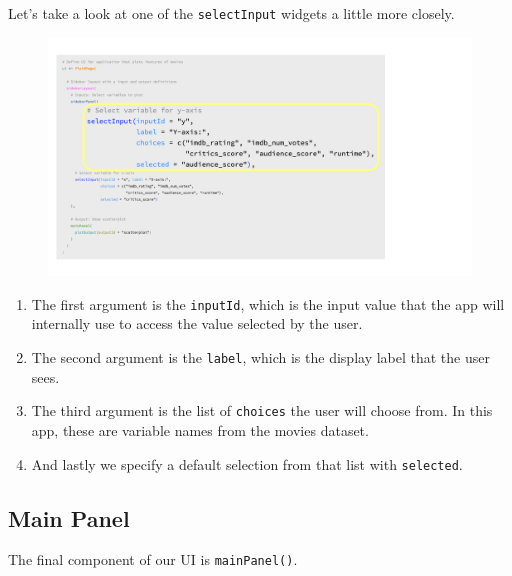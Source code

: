 \documentclass[
  letterpaper,
  DIV=11,
  numbers=noendperiod]{scrreprt}
\begin{document}
Let's take a look at one of the \texttt{selectInput} widgets a little
more closely.

\begin{figure}

{\centering \includegraphics[width=1\textwidth,height=\textheight]{./images/input-closeup.png}

}

\end{figure}

\begin{enumerate}
\def\labelenumi{\arabic{enumi}.}
\item
  The first argument is the \texttt{inputId}, which is the input value
  that the app will internally use to access the value selected by the
  user.
\item
  The second argument is the \texttt{label}, which is the display label
  that the user sees.
\item
  The third argument is the list of \texttt{choices} the user will
  choose from. In this app, these are variable names from the movies
  dataset.
\item
  And lastly we specify a default selection from that list with
  \texttt{selected}.
\end{enumerate}

\hypertarget{main-panel-1}{%
\subsection{Main Panel}\label{main-panel-1}}

The final component of our UI is \texttt{mainPanel()}.
\end{document}
